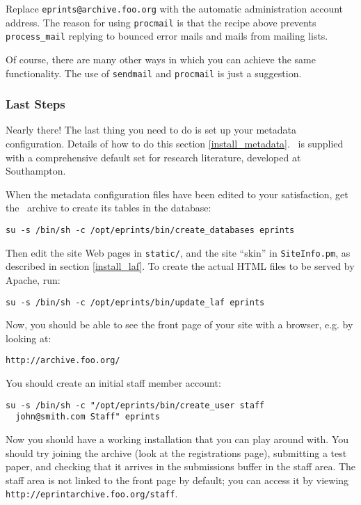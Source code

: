 Replace {\tt eprints@archive.foo.org} with the automatic administration account address. The reason for using {\tt procmail} is that the recipe above prevents {\tt process\_mail} replying to bounced error mails and mails from mailing lists.

Of course, there are many other ways in which you can achieve the same functionality. The use of {\tt sendmail} and {\tt procmail} is just a suggestion.


\subsubsection{Last Steps}
\label{install_last_steps}

Nearly there! The last thing you need to do is set up your metadata configuration. Details of how to do this section \ref{install_metadata}. \eprints\ is supplied with a comprehensive default set for research literature, developed at Southampton.

When the metadata configuration files have been edited to your satisfaction, get the \eprints\ archive to create its tables in the database:

\begin{verbatim}
su -s /bin/sh -c /opt/eprints/bin/create_databases eprints
\end{verbatim}

Then edit the site Web pages in {\tt static/}, and the site ``skin'' in {\tt SiteInfo.pm}, as described in section \ref{install_laf}. To create the actual HTML files to be served by Apache, run:

\begin{verbatim}
su -s /bin/sh -c /opt/eprints/bin/update_laf eprints
\end{verbatim}

Now, you should be able to see the front page of your site with a browser, e.g. by looking at:

\begin{verbatim}
http://archive.foo.org/
\end{verbatim}

You should create an initial staff member account:

\begin{verbatim}
su -s /bin/sh -c "/opt/eprints/bin/create_user staff
  john@smith.com Staff" eprints
\end{verbatim}


Now you should have a working installation that you can play around with. You should try joining the archive (look at the registrations page), submitting a test paper, and checking that it arrives in the submissions buffer in the staff area. The staff area is not linked to the front page by default; you can access it by viewing {\tt http://eprintarchive.foo.org/staff}.


